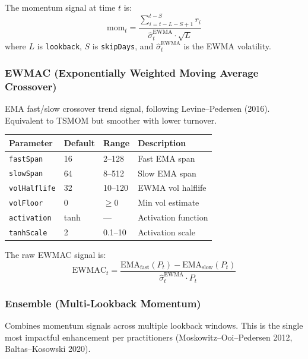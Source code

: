 \documentclass[11pt,a4paper]{article}
\begin{document}
The momentum signal at time $t$ is:
\begin{equation}
\text{mom}_t = \frac{\sum_{i=t-L-S+1}^{t-S} r_i}{\hat{\sigma}_t^{\text{EWMA}} \cdot \sqrt{L}}
\end{equation}
where $L$ is \texttt{lookback}, $S$ is \texttt{skipDays}, and $\hat{\sigma}_t^{\text{EWMA}}$ is the EWMA volatility.

\subsubsection{EWMAC (Exponentially Weighted Moving Average Crossover)}
EMA fast/slow crossover trend signal, following Levine--Pedersen (2016). Equivalent to TSMOM but smoother with lower turnover.

\begin{center}
\begin{tabularx}{\textwidth}{l l l X}
\toprule
\textbf{Parameter} & \textbf{Default} & \textbf{Range} & \textbf{Description} \\
\midrule
\texttt{fastSpan} & 16 & 2--128 & Fast EMA span \\
\texttt{slowSpan} & 64 & 8--512 & Slow EMA span \\
\texttt{volHalflife} & 32 & 10--120 & EWMA vol halflife \\
\texttt{volFloor} & 0 & $\geq 0$ & Min vol estimate \\
\texttt{activation} & tanh & --- & Activation function \\
\texttt{tanhScale} & 2 & 0.1--10 & Activation scale \\
\bottomrule
\end{tabularx}
\end{center}

The raw EWMAC signal is:
\begin{equation}
\text{EWMAC}_t = \frac{\text{EMA}_{\text{fast}}(P_t) - \text{EMA}_{\text{slow}}(P_t)}{\hat{\sigma}_t^{\text{EWMA}} \cdot P_t}
\end{equation}

\subsubsection{Ensemble (Multi-Lookback Momentum)}
Combines momentum signals across multiple lookback windows. This is the single most impactful enhancement per practitioners (Moskowitz--Ooi--Pedersen 2012, Baltas--Kosowski 2020).
\end{document}
